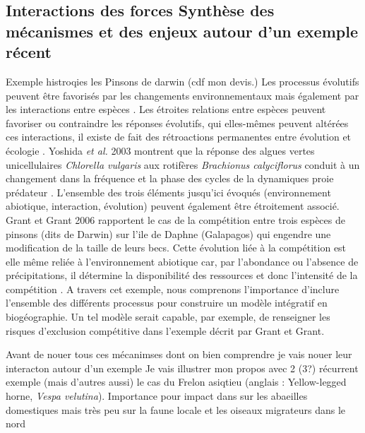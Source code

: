 \subsection*{Interactions des forces Synthèse des mécanismes et des
enjeux autour d'un exemple
récent}\label{interactions-des-forces-synthuxe8se-des-muxe9canismes-et-des-enjeux-autour-dun-exemple-ruxe9cent}

Exemple histroqies les Pinsons de darwin (cdf mon devis.) Les processus
évolutifs peuvent être favorisés par les changements environnementaux
mais également par les interactions entre espèces \cite{Tingley2009}.
Les étroites relations entre espèces peuvent favoriser ou contraindre
les réponses évolutifs, qui elles-mêmes peuvent altérées ces
interactions, il existe de fait des rétroactions permanentes entre
évolution et écologie \cite{Post2009}. Yoshida \textit{et al.} 2003
montrent que la réponse des algues vertes unicellulaires
\textit{Chlorella vulgaris} aux rotifères
\textit{Brachionus calyciflorus} conduit à un changement dans la
fréquence et la phase des cycles de la dynamiques proie prédateur
\cite{Yoshida2003}. L'ensemble des trois éléments jusqu'ici évoqués
(environnement abiotique, interaction, évolution) peuvent également être
étroitement associé. Grant et Grant 2006 rapportent le cas de la
compétition entre trois espèces de pinsons (dits de Darwin) sur l'ile de
Daphne (Galapagos) qui engendre une modification de la taille de leurs
becs. Cette évolution liée à la compétition est elle même reliée à
l'environnement abiotique car, par l'abondance ou l'absence de
précipitations, il détermine la disponibilité des ressources et donc
l'intensité de la compétition \cite{Grant2006}. A travers cet exemple,
nous comprenons l'importance d'inclure l'ensemble des différents
processus pour construire un modèle intégratif en biogéographie. Un tel
modèle serait capable, par exemple, de renseigner les risques
d'exclusion compétitive dans l'exemple décrit par Grant et Grant.

Avant de nouer tous ces mécanimses dont on bien comprendre je vais nouer
leur interacton autour d'un exemple Je vais illustrer mon propos avec 2
(3?) récurrent exemple (mais d'autres aussi) le cas du Frelon asiqtieu
(anglais : Yellow-legged horne, \emph{Vespa velutina}). Importance pour
impact dans sur les abaeilles domestiques mais très peu sur la faune
locale et les oiseaux migrateurs dans le nord

